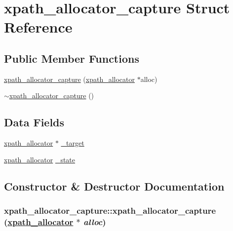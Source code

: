 \hypertarget{structxpath__allocator__capture}{
\section{xpath\_\-allocator\_\-capture Struct Reference}
\label{structxpath__allocator__capture}
}
\subsection*{Public Member Functions}
\begin{CompactItemize}
\item 
\hyperlink{structxpath__allocator__capture_f6925e08c811c0cbda74d4da5b9f2eed}{xpath\_\-allocator\_\-capture} (\hyperlink{classxpath__allocator}{xpath\_\-allocator} $\ast$alloc)
\item 
\hyperlink{structxpath__allocator__capture_09d4f62de6a543483b94eec405667101}{$\sim$xpath\_\-allocator\_\-capture} ()
\end{CompactItemize}
\subsection*{Data Fields}
\begin{CompactItemize}
\item 
\hyperlink{classxpath__allocator}{xpath\_\-allocator} $\ast$ \hyperlink{structxpath__allocator__capture_382acca931c691699ec84a03fb060cf4}{\_\-target}
\item 
\hyperlink{classxpath__allocator}{xpath\_\-allocator} \hyperlink{structxpath__allocator__capture_275859dc99681c12b42ee4f51b713d39}{\_\-state}
\end{CompactItemize}


\subsection{Constructor \& Destructor Documentation}
\hypertarget{structxpath__allocator__capture_f6925e08c811c0cbda74d4da5b9f2eed}{
\subsubsection[xpath\_\-allocator\_\-capture]{\setlength{\rightskip}{0pt plus 5cm}xpath\_\-allocator\_\-capture::xpath\_\-allocator\_\-capture (\hyperlink{classxpath__allocator}{xpath\_\-allocator} $\ast$ {\em alloc})}}
\label{structxpath__allocator__capture_f6925e08c811c0cbda74d4da5b9f2eed}


